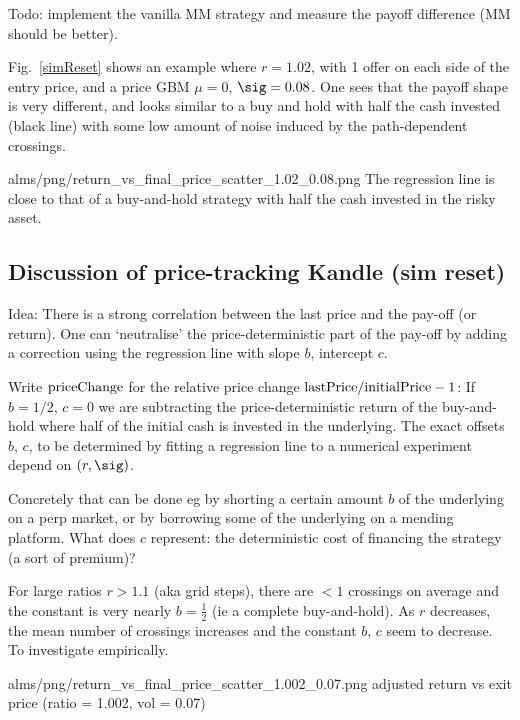 \documentclass[oneside,10pt]{article}
\begin{document}
Todo: implement the vanilla MM strategy and measure the payoff difference (MM should be better).

Fig.~\ref{simReset} shows an example where $r=1.02$, with 1 offer on each side of the entry price, and a price GBM $\mu=0$, $\sig=0.08$.
One sees that the payoff shape is very different, and looks
similar to a buy and hold with half the cash invested (black line)
with some low amount of noise induced by the path-dependent crossings.


\IG{250pt}
{alms/png/return_vs_final_price_scatter_1.02_0.08.png}
{\label{simReset} The regression line is close to that of a buy-and-hold strategy
with half the cash invested in the risky asset.}


\subsection{Discussion of price-tracking Kandle (sim reset)}

Idea: 
There is a strong correlation between the last price and the pay-off (or return).
One can `neutralise' the price-deterministic part of the pay-off by adding 
a correction using the regression line with slope $b$, intercept $c$. 

Write $\hbox{priceChange}$ for the relative price change
$\hbox{lastPrice}/\hbox{initialPrice} - 1$:
If $b=1/2$, $c=0$ we are subtracting the price-deterministic return of the buy-and-hold
where half of the initial cash is invested in the underlying.
The exact offsets $b$, $c$, to be determined by fitting a regression line
to a numerical experiment depend on $(r,\sig)$.

Concretely that can be done eg by shorting a certain amount $b$ of the underlying on a perp market,
or by borrowing some of the underlying on a mending platform. What does $c$ represent: 
the deterministic cost of financing the strategy (a sort of premium)?

For large ratios $r>1.1$ (aka grid steps), 
there are $<1$ crossings on average and the constant is very nearly $b=\frac12$ (ie a complete buy-and-hold).
As $r$ decreases, the mean number of crossings increases and the constant $b$, $c$ seem to decrease.
To investigate empirically.

\IG{200pt}
{alms/png/return_vs_final_price_scatter_1.002_0.07.png}
{adjusted return vs exit price (ratio = 1.002, vol = 0.07)}
\end{document}
